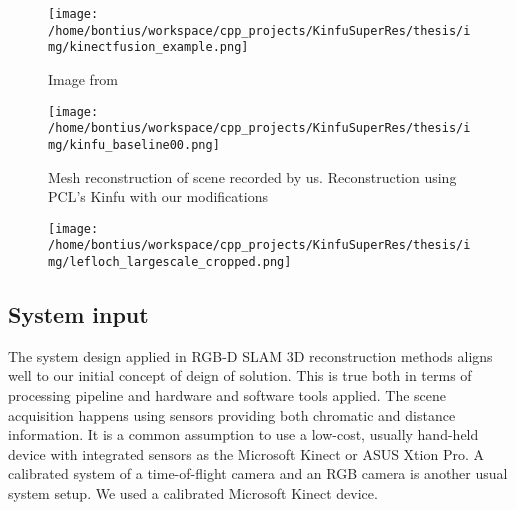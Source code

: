 \documentclass{ucl_thesis}
\begin{document}
\begin{figure}[h!]\centering
	\begin{minipage}[b]{0.33\linewidth}
		\texttt{[image: /home/bontius/workspace/cpp\_projects/KinfuSuperRes/thesis/img/kinectfusion\_example.png]}
		\caption{Image from \citep{KinectFuSDKExample}}
		\label{fig:kinectsdk_example}
	\end{minipage}
	\begin{minipage}[b]{0.33\linewidth}
		\texttt{[image: /home/bontius/workspace/cpp\_projects/KinfuSuperRes/thesis/img/kinfu\_baseline00.png]}
		\caption{Mesh reconstruction of scene recorded by us. Reconstruction using PCL's Kinfu with our modifications}
		\label{fig:kinfu_baseline}
	\end{minipage}
	\begin{minipage}[b]{0.33\linewidth}
		\texttt{[image: /home/bontius/workspace/cpp\_projects/KinfuSuperRes/thesis/img/lefloch\_largescale\_cropped.png]}
		\caption{\citep{keller13realtime}}
		\label{fig:lefloch}
	\end{minipage}
\end{figure}



\subsection{System input}
\par The system design applied in RGB-D SLAM 3D reconstruction methods aligns well to our initial concept of deign of solution. This is true both in terms of processing pipeline and hardware and software tools applied. The scene acquisition happens using sensors providing both chromatic and distance information. It is a common assumption to use a low-cost, usually hand-held device with integrated sensors as the Microsoft Kinect or ASUS Xtion Pro. A calibrated system of a time-of-flight camera and an RGB camera is another usual system setup. We used a calibrated Microsoft Kinect device. \\
\end{document}

